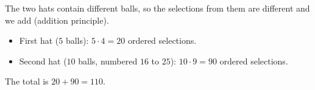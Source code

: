 The two hats contain different balls, so the selections from them are different and we add (addition principle).
\begin{itemize}
\item First hat ($5$ balls): $5\cdot4=20$ ordered selections.
\item Second hat ($10$ balls, numbered $16$ to $25$): $10\cdot9=90$ ordered selections.
\end{itemize}
The total is $20+90=\boxed{110}$.
